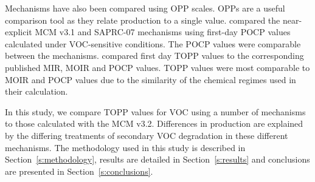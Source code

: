 Mechanisms have also been compared using OPP scales.
OPPs are a useful comparison tool as they relate  production to a single value. 
\citet{Derwent:2010} compared the near-explicit MCM v3.1 and SAPRC-07 mechanisms using first-day POCP values calculated under VOC-sensitive conditions. 
The POCP values were comparable between the mechanisms.  
\citet{Butler:2011} compared first day TOPP values to the corresponding published MIR, MOIR and POCP values.
TOPP values were most comparable to MOIR and POCP values due to the similarity of the chemical regimes used in their calculation. 

In this study, we compare TOPP values for VOC using a number of mechanisms to those calculated with the MCM v3.2. 
Differences in  production are explained by the differing treatments of secondary VOC degradation in these different mechanisms.
The methodology used in this study is described in \mbox{Section \ref{s:methodology}}, results are detailed in \mbox{Section \ref{s:results}} and conclusions are presented in \mbox{Section \ref{s:conclusions}}.
